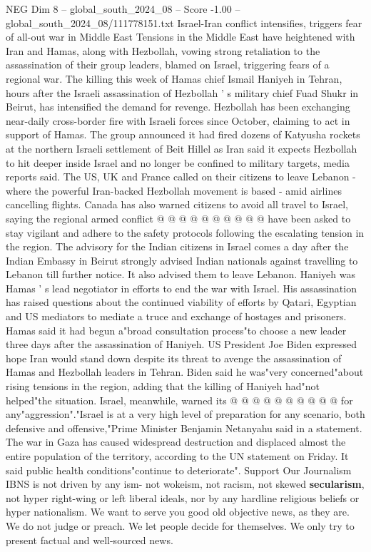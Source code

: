 \begin{textsample}{NEG Dim 8 – global\_south\_2024\_08 – Score -1.00 – global\_south\_2024\_08/111778151.txt}  \label{ex:f8_neg_282}
Israel-Iran conflict intensifies, triggers fear of all-out war in Middle East Tensions in the Middle East have heightened with Iran and Hamas, along with Hezbollah, vowing strong retaliation to the assassination of their group leaders, blamed on Israel, triggering fears of a regional war.
The killing this week of Hamas chief Ismail Haniyeh in Tehran, hours after the Israeli assassination of Hezbollah ' s military chief Fuad Shukr in Beirut, has intensified the demand for revenge.
Hezbollah has been exchanging near-daily cross-border fire with Israeli forces since October, claiming to act in support of Hamas.
The group announced it had fired dozens of Katyusha rockets at the northern Israeli settlement of Beit Hillel as Iran said it expects Hezbollah to hit deeper inside Israel and no longer be confined to military targets, media reports said.
The US, UK and France called on their citizens to leave Lebanon - where the powerful Iran-backed Hezbollah movement is based - amid airlines cancelling flights.
Canada has also warned citizens to avoid all travel to Israel, saying the regional armed conflict @ @ @ @ @ @ @ @ @ @ have been asked to stay vigilant and adhere to the safety protocols following the escalating tension in the region.
The advisory for the Indian citizens in Israel comes a day after the Indian Embassy in Beirut strongly advised Indian nationals against travelling to Lebanon till further notice.
It also advised them to leave Lebanon.
Haniyeh was Hamas ' s lead negotiator in efforts to end the war with Israel.
His assassination has raised questions about the continued viability of efforts by Qatari, Egyptian and US mediators to mediate a truce and exchange of hostages and prisoners.
Hamas said it had begun a"broad consultation process"to choose a new leader three days after the assassination of Haniyeh.
US President Joe Biden expressed hope Iran would stand down despite its threat to avenge the assassination of Hamas and Hezbollah leaders in Tehran.
Biden said he was"very concerned"about rising tensions in the region, adding that the killing of Haniyeh had"not helped"the situation.
Israel, meanwhile, warned its @ @ @ @ @ @ @ @ @ @ for any"aggression"."Israel is at a very high level of preparation for any scenario, both defensive and offensive,"Prime Minister Benjamin Netanyahu said in a statement.
The war in Gaza has caused widespread destruction and displaced almost the entire population of the territory, according to the UN statement on Friday.
It said public health conditions"continue to deteriorate".
Support Our Journalism IBNS is not driven by any ism- not wokeism, not racism, not skewed \textbf{secularism}, not hyper right-wing or left liberal ideals, nor by any hardline religious beliefs or hyper nationalism.
We want to serve you good old objective news, as they are.
We do not judge or preach.
We let people decide for themselves.
We only try to present factual and well-sourced news.

\end{textsample}
